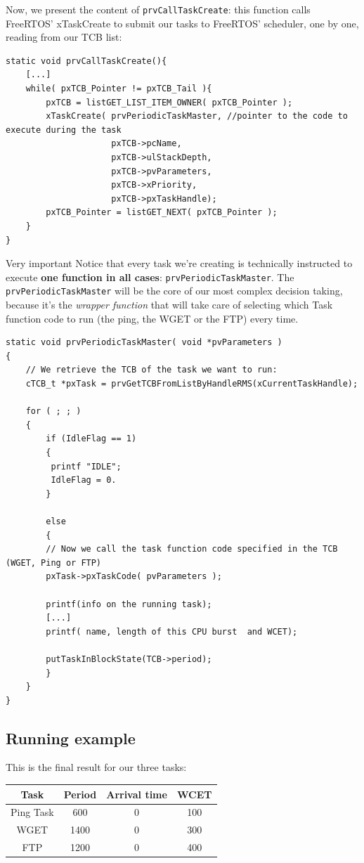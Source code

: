 \documentclass[10pt]{article}
\begin{document}
\newpage
Now, we present the content of \verb|prvCallTaskCreate|: this function calls FreeRTOS' xTaskCreate to submit our tasks to FreeRTOS' scheduler, one by one, reading from our TCB list:
\begin{lstlisting}
static void prvCallTaskCreate(){
    [...]
    while( pxTCB_Pointer != pxTCB_Tail ){
        pxTCB = listGET_LIST_ITEM_OWNER( pxTCB_Pointer );
        xTaskCreate( prvPeriodicTaskMaster, //pointer to the code to execute during the task
                     pxTCB->pcName,
                     pxTCB->ulStackDepth,
                     pxTCB->pvParameters,
                     pxTCB->xPriority,
                     pxTCB->pxTaskHandle);
        pxTCB_Pointer = listGET_NEXT( pxTCB_Pointer );
    }
}
\end{lstlisting}
\begin{Warning}{Very important}
Notice that every task we're creating is technically instructed to execute \textbf{one function in all cases}: \verb|prvPeriodicTaskMaster|.
The \verb|prvPeriodicTaskMaster| will be the core of our most complex decision taking, because it's the \textit{wrapper function} that will take care of selecting which Task function code to run (the ping, the WGET or the FTP) every time.

\begin{lstlisting}
static void prvPeriodicTaskMaster( void *pvParameters )
{
    // We retrieve the TCB of the task we want to run:
    cTCB_t *pxTask = prvGetTCBFromListByHandleRMS(xCurrentTaskHandle);
    
    for ( ; ; )
    {
        if (IdleFlag == 1)
        {
         printf "IDLE";
         IdleFlag = 0.
        }
    
        else 
        {
        // Now we call the task function code specified in the TCB (WGET, Ping or FTP)
        pxTask->pxTaskCode( pvParameters );
        
        printf(info on the running task);
        [...]
        printf( name, length of this CPU burst 	and WCET);
 		
        putTaskInBlockState(TCB->period);
        }        
    }
}

\end{lstlisting}
\end{Warning}

\subsection{Running example}
This is the final result for our three tasks:
\begin{center}
\begin{tabular}{|c||c|c|c|}
\hline 
\rule[-1ex]{0pt}{2.5ex} Task & Period & Arrival time & WCET \\ 
\hline 
\rule[-1ex]{0pt}{2.5ex} Ping Task & 600 & 0 & 100 \\ 
\hline 
\rule[-1ex]{0pt}{2.5ex} WGET & 1400 & 0 & 300 \\ 
\hline 
\rule[-1ex]{0pt}{2.5ex} FTP & 1200 & 0 & 400 \\ 
\hline 
\end{tabular}
\end{center}
\end{document}
